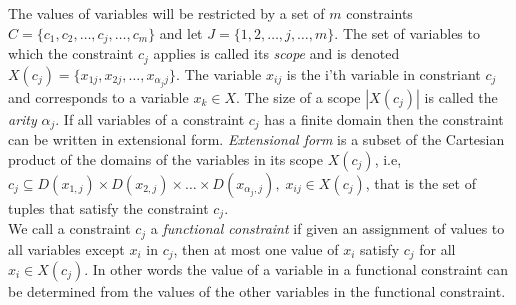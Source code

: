 The values of variables will be restricted by a set of $m$ constraints $C= \{ c_1,c_2, \dots, c_j, \dots , c_m \} $ and 
let $J = 
\{1,2,\dots,j,\dots , m\}$. The set of 
variables to which the constraint $c_j$ applies is called its \emph{scope} and is denoted 
$X(c_j) = \{x_{1j}, x_{2j} , \dots , x_{\alpha_jj}\}$. The variable $x_ {ij}$ is the i'th variable in constriant $c_j$ 
and corresponds to a variable $x_k\in X$.  
The size of a scope $|X(c_j)|$ is called the \emph{arity} $\alpha_j$. If all variables of a constraint $c_j$ has a 
finite domain then the constraint can be written in extensional form. \emph{Extensional form} is a 
subset of the Cartesian product of the domains of the variables in its scope $X(c_j)$, i.e, $c_j \subseteq 
D(x_{1,j}) \times D(x_{2,j}) \times \dots \times D(x_{{\alpha_j},j}), \; x_{ij} \in X(c_j)$, that is the set 
of tuples that satisfy the constraint $c_j$. \\
We call a constraint $c_j$ a \emph{functional constraint} if given an assignment of values to all variables except 
$x_i$ in $c_j$, then at most one value of $x_i$ satisfy $c_j$ for all $x_i \in X(c_j)$. In other words the value of a 
variable in a functional constraint can be determined from the values of the other variables in the functional 
constraint.

\iffalse

